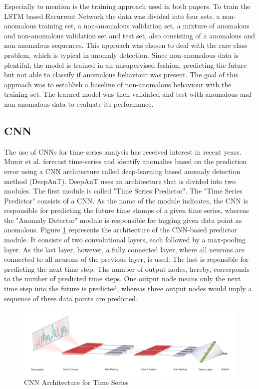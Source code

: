 Especially to mention is the training approach used in both papers. To train the  LSTM based Recurrent Network the data was divided into four sets. a non-anomalous training set, a non-anomalous validation set, a mixture of anomalous and non-anomalous validation set and test set, also consisting of a anomalous and non-anomalous sequences. This approach was chosen to deal with the rare class problem, which is typical in anomaly detection. Since non-anomalous data is plentiful, the model is trained in an unsupervised fashion, predicting the future but not able to classify if anomalous behaviour was present. The goal of this approach was to establish a baseline of non-anomalous behaviour with the training set. The learned model was then validated and test with anomalous and non-anomalous data to evaluate its performance.



\subsection{CNN} \label{CNN on univariate series}

The use of CNNs for time-series analysis has received interest in recent years. Munir et al. \parencite*{Munir2019} forecast time-series and identify anomalies based on the prediction error using a CNN architecture called deep-learning based anomaly detection method (DeepAnT). DeepAnT uses an architecture that is divided into two modules. The first module is called "Time Series Predictor". The "Time Series Predictor" consists of a CNN. As the name of the module indicates, the CNN is responsible for predicting the future time stamps of a given time series, whereas  the "Anomaly Detector" module is responsible for tagging given data point as anomalous. Figure \ref{fig:CNN} represents the architecture of the CNN-based predictor module. It consists of two convolutional layers, each followed by a max-pooling layer. As the last layer, however, a fully connected layer, where all neurons are connected to all neurons of the previous layer, is used. The last is reponsible for predicting the next time step. The number of output nodes, hereby, corresponds to the number of predicted time steps. One output node means only the next time step into the future is predicted, whereas three output nodes would imply a sequence of three data points are predicted.     


\begin{figure}[h]
	\centering
	\includegraphics[scale=0.4]{Figures/CNN}
	\decoRule
	\caption[CNN Architecture for Time Series]{CNN Architecture for Time Series \parencite{Munir2019}}
	\label{fig:CNN}
\end{figure}

